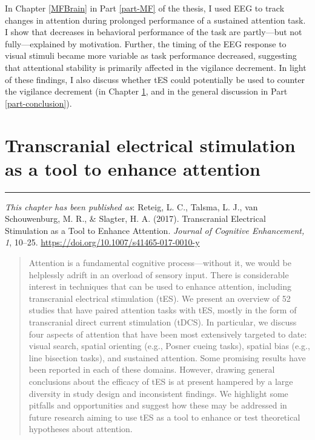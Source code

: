 \documentclass[11pt,]{memoir}
\begin{document}
In Chapter \ref{MFBrain} in Part \ref{part-MF} of the thesis, I used EEG to track changes in attention during prolonged performance of a sustained attention task. I show that decreases in behavioral performance of the task are partly---but not fully---explained by motivation. Further, the timing of the EEG response to visual stimuli became more variable as task performance decreased, suggesting that attentional stability is primarily affected in the vigilance decrement. In light of these findings, I also discuss whether tES could potentially be used to counter the vigilance decrement (in Chapter \ref{tDCS-att-review}, and in the general discussion in Part \ref{part-conclusion}).

\hypertarget{tDCS-att-review}{%
\chapter{Transcranial electrical stimulation as a tool to enhance attention}\label{tDCS-att-review}}


\vspace*{\fill}

\begin{center}\rule{0.5\linewidth}{\linethickness}\end{center}

\small

\noindent
\emph{This chapter has been published as}: Reteig, L. C., Talsma, L. J., van Schouwenburg, M. R., \& Slagter, H. A. (2017). Transcranial Electrical Stimulation as a Tool to Enhance Attention. \emph{Journal of Cognitive Enhancement, 1}, 10--25. \url{https://doi.org/10.1007/s41465-017-0010-y}
\newpage
\normalsize

\begin{abstract}
Attention is a fundamental cognitive process---without it, we would be helplessly adrift in an overload of sensory input. There is considerable interest in techniques that can be used to enhance attention, including transcranial electrical stimulation (tES). We present an overview of 52 studies that have paired attention tasks with tES, mostly in the form of transcranial direct current stimulation (tDCS). In particular, we discuss four aspects of attention that have been most extensively targeted to date: visual search, spatial orienting (e.g., Posner cueing tasks), spatial bias (e.g., line bisection tasks), and sustained attention. Some promising results have been reported in each of these domains. However, drawing general conclusions about the efficacy of tES is at present hampered by a large diversity in study design and inconsistent findings. We highlight some pitfalls and opportunities and suggest how these may be addressed in future research aiming to use tES as a tool to enhance or test theoretical hypotheses about attention.
\end{abstract} \newpage
\end{document}
